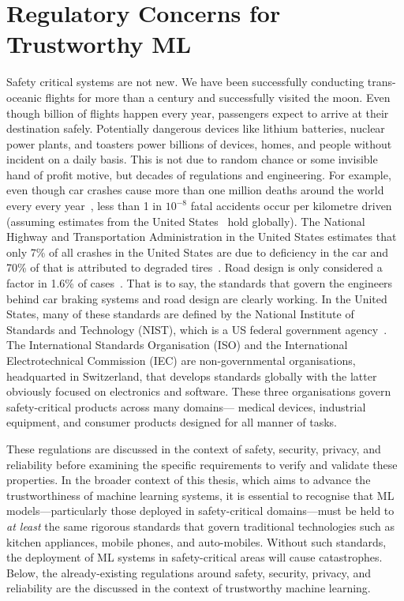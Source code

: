 \chapter{Regulatory Concerns for Trustworthy ML}
\label{ch:safety}
Safety critical systems are not new. 
We have been successfully conducting trans-oceanic flights for more than a century and successfully visited the moon. 
Even though billion of flights happen every year, passengers expect to arrive at their destination safely. 
Potentially dangerous devices like lithium batteries, nuclear power plants, and toasters power billions of devices, homes, and people without incident on a daily basis. 
This is not due to random chance or some invisible hand of profit motive, but decades of regulations and engineering. 
For example, even though car crashes cause more than one million deaths around the world every every year~\cite{WHO_road_injuries}, less than 1 in $10^{-8}$ fatal accidents occur per kilometre driven (assuming estimates from the United States~\cite{nsc} hold globally). 
The National Highway and Transportation Administration in the United States estimates that only 7\% of all crashes in the United States are due to deficiency in the car and 70\% of that is attributed to degraded tires~\cite{nhtsa}. 
Road design is only considered a factor in 1.6\% of cases~\cite{nhtsa}. 
That is to say, the standards that govern the engineers behind car braking systems and road design are clearly working. 
In the United States, many of these standards are defined by the National Institute of Standards and Technology (NIST), which is a US federal government agency~\cite{nist_summary}.
The International Standards Organisation (ISO) and the International Electrotechnical Commission (IEC) are non-governmental organisations, headquarted in Switzerland, that develops standards globally with the latter obviously focused on electronics and software. 
These three organisations govern safety-critical products across many domains--- medical devices, industrial equipment, and consumer products designed for all manner of tasks. 

These regulations are discussed in the context of safety, security, privacy, and reliability before examining the specific requirements to verify and validate these properties. 
In the broader context of this thesis, which aims to advance the trustworthiness of machine learning systems, it is essential to recognise that ML models—particularly those deployed in safety-critical domains—must be held to \textit{at least} the same rigorous standards that govern traditional technologies such as kitchen appliances, mobile phones, and auto-mobiles. 
Without such standards, the deployment of ML systems in safety-critical areas will cause catastrophes.
Below, the already-existing regulations around safety, security, privacy, and reliability are the discussed in the context of trustworthy machine learning.


